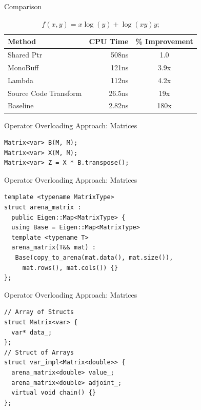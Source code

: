 \documentclass[dvipsnames]{beamer}
\begin{document}

\begin{frame}{Comparison}
\begin{table}
  \centering %
  \caption{$f(x, y) = x\log(y) + \log(xy) y$;} %
  \label{tab:firsttable} %
  \begin{tabular}{|l|r|c|} %
    \hline %
    Method & CPU Time & \% Improvement \\ %
    \hline %
    Shared Ptr & 508ns & 1.0 \\
    MonoBuff   & 121ns & 3.9x \\
    Lambda     & 112ns & 4.2x \\
    Source Code Transform        &  26.5ns & 19x \\
    Baseline & 2.82ns & 180x\\
    \hline %
  \end{tabular}
\end{table}
\end{frame}

\begin{frame}[fragile]{Operator Overloading Approach: Matrices}
\begin{verbatim}
Matrix<var> B(M, M);
Matrix<var> X(M, M);
Matrix<var> Z = X * B.transpose();
\end{verbatim}
\end{frame}

\begin{frame}[fragile]{Operator Overloading Approach: Matrices}
\begin{verbatim}
template <typename MatrixType>
struct arena_matrix :
  public Eigen::Map<MatrixType> {
  using Base = Eigen::Map<MatrixType>
  template <typename T>
  arena_matrix(T&& mat) :
   Base(copy_to_arena(mat.data(), mat.size()),
     mat.rows(), mat.cols()) {}
};
\end{verbatim}
\end{frame}

\begin{frame}[fragile]{Operator Overloading Approach: Matrices}
\begin{verbatim}
// Array of Structs
struct Matrix<var> {
  var* data_;
};
// Struct of Arrays
struct var_impl<Matrix<double>> {
  arena_matrix<double> value_;
  arena_matrix<double> adjoint_;
  virtual void chain() {}
};
\end{verbatim}
\vspace{-8mm}
\end{frame}
\end{document}
